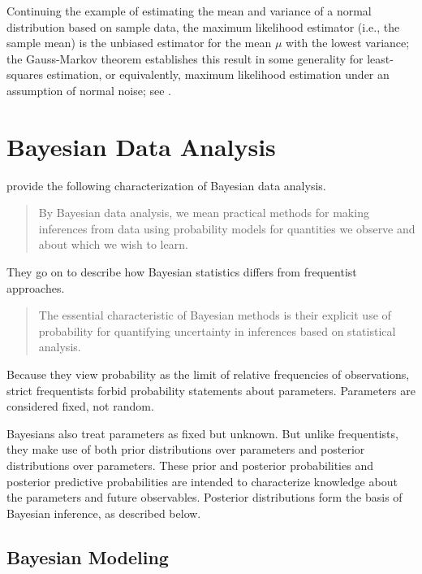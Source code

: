 Continuing the example of estimating the mean and variance of a normal
distribution based on sample data, the maximum likelihood estimator
(i.e., the sample mean) is the unbiased estimator for the mean $\mu$
with the lowest variance; the Gauss-Markov theorem establishes this
result in some generality for least-squares estimation, or
equivalently, maximum likelihood estimation under an assumption of
normal noise; see \citep[Section~3.2.2]{HastieTibshiraniFriedman:2009}.











\chapter{Bayesian Data Analysis}\label{bayesian.chapter}

\noindent
\cite{GelmanEtAl:2013} provide the following
characterization of Bayesian data analysis.
%
\begin{quote}
  By Bayesian data analysis, we mean practical methods for making
  inferences from data using probability models for quantities we
  observe and about which we wish to learn.
\end{quote}
%
They go on to describe how Bayesian statistics differs from
frequentist approaches.
%
\begin{quote}
  The essential characteristic of Bayesian methods is their explicit
  use of probability for quantifying uncertainty in inferences based
  on statistical analysis.
\end{quote}
%
Because they view probability as the limit of relative frequencies of
observations, strict frequentists forbid probability statements about
parameters.  Parameters are considered fixed, not random.  

Bayesians also treat parameters as fixed but unknown.  But unlike
frequentists, they make use of both prior distributions over
parameters and posterior distributions over parameters.  These prior
and posterior probabilities and posterior predictive probabilities are
intended to characterize knowledge about the parameters and future
observables.  Posterior distributions form the basis of Bayesian
inference, as described below.

\section{Bayesian Modeling}

